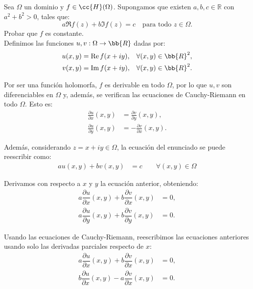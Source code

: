 \begin{ejercicio}
    Sea $\Omega$ un dominio y $f \in \cc{H}(\Omega)$. Supongamos que existen $a, b, c \in \mathbb{R}$ con $a^2 + b^2 > 0$, tales que:
    \[
        a\Re f(z) + b\Im f(z) = c \quad \text{para todo } z \in \Omega.
    \]
    Probar que $f$ es constante.\\

    Definimos las funciones $u,v:\Omega\to\bb{R}$ dadas por:
    \begin{align*}
        u(x,y) &= \Re f(x+iy),&\forall (x,y)\in\bb{R}^2,\\
        v(x,y) &= \Im f(x+iy),&\forall (x,y)\in\bb{R}^2.
    \end{align*}

    Por ser una función holomorfa, $f$ es derivable en todo $\Omega$, por lo que $u,v$ son diferenciables en $\Omega$ y, además, se verifican las ecuaciones de Cauchy-Riemann en todo $\Omega$. Esto es:
    \begin{align*}
        \frac{\partial u}{\partial x}(x,y) &= \frac{\partial v}{\partial y}(x,y),\\
        \frac{\partial u}{\partial y}(x,y) &= -\frac{\partial v}{\partial x}(x,y).
    \end{align*}

    Además, considerando $z=x+iy\in \Omega$, la ecuación del enunciado se puede reescribir como:
    \begin{align*}
        au(x,y) + bv(x,y) &= c\qquad \forall (x,y)\in\Omega
    \end{align*}

    Derivamos con respecto a $x$ y $y$ la ecuación anterior, obteniendo:
    \begin{align*}
        a\dfrac{\partial u}{\partial x}(x,y) + b\dfrac{\partial v}{\partial x}(x,y) &= 0,\\
        a\dfrac{\partial u}{\partial y}(x,y) + b\dfrac{\partial v}{\partial y}(x,y) &= 0.
    \end{align*}

    Usando las ecuaciones de Cauchy-Riemann, reescribimos las ecuaciones anteriores usando solo las derivadas parciales respecto de $x$:
    \begin{align*}
        a\dfrac{\partial u}{\partial x}(x,y) + b\dfrac{\partial v}{\partial x}(x,y) &= 0,\\
        b\dfrac{\partial u}{\partial x}(x,y) -a\dfrac{\partial v}{\partial x}(x,y) &= 0.
    \end{align*}


\end{ejercicio}
